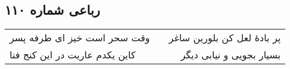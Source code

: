 \begin{center}
\section*{رباعی شماره ۱۱۰}
\label{sec:sh110}
\begin{longtable}{l p{0.5cm} r}
وقت سحر است خیز ای طرفه پسر
&&
پر بادهٔ لعل کن بلورین ساغر
\\
کاین یکدم عاریت در این کنج فنا
&&
بسیار بجویی و نیابی دیگر
\\
\end{longtable}
\end{center}
